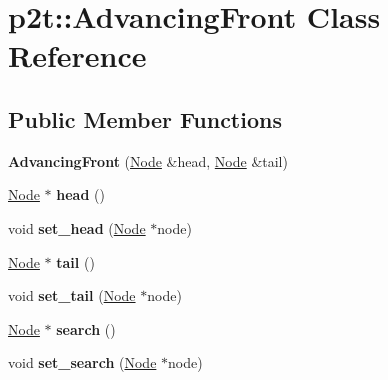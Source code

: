 \hypertarget{classp2t_1_1_advancing_front}{\section{p2t\+:\+:Advancing\+Front Class Reference}
\label{classp2t_1_1_advancing_front}
}
\subsection*{Public Member Functions}
\begin{DoxyCompactItemize}
\item 
\hypertarget{classp2t_1_1_advancing_front_aaea788406dc0ede87ab08901b64e6a62}{{\bfseries Advancing\+Front} (\hyperlink{structp2t_1_1_node}{Node} \&head, \hyperlink{structp2t_1_1_node}{Node} \&tail)}\label{classp2t_1_1_advancing_front_aaea788406dc0ede87ab08901b64e6a62}

\item 
\hypertarget{classp2t_1_1_advancing_front_a1aaf09a3d1fd17743549de1a77965883}{\hyperlink{structp2t_1_1_node}{Node} $\ast$ {\bfseries head} ()}\label{classp2t_1_1_advancing_front_a1aaf09a3d1fd17743549de1a77965883}

\item 
\hypertarget{classp2t_1_1_advancing_front_a07f4df2b993ec6fba32491d87d76aefe}{void {\bfseries set\+\_\+head} (\hyperlink{structp2t_1_1_node}{Node} $\ast$node)}\label{classp2t_1_1_advancing_front_a07f4df2b993ec6fba32491d87d76aefe}

\item 
\hypertarget{classp2t_1_1_advancing_front_a61de74fbeeb93ff0481de377d5072370}{\hyperlink{structp2t_1_1_node}{Node} $\ast$ {\bfseries tail} ()}\label{classp2t_1_1_advancing_front_a61de74fbeeb93ff0481de377d5072370}

\item 
\hypertarget{classp2t_1_1_advancing_front_a3e42d890f8871eecdbd9789d141800b8}{void {\bfseries set\+\_\+tail} (\hyperlink{structp2t_1_1_node}{Node} $\ast$node)}\label{classp2t_1_1_advancing_front_a3e42d890f8871eecdbd9789d141800b8}

\item 
\hypertarget{classp2t_1_1_advancing_front_a77046a96ab291e136dfd3072b74b88b5}{\hyperlink{structp2t_1_1_node}{Node} $\ast$ {\bfseries search} ()}\label{classp2t_1_1_advancing_front_a77046a96ab291e136dfd3072b74b88b5}

\item 
\hypertarget{classp2t_1_1_advancing_front_a27bbf888fd7c036db00347278591c2c4}{void {\bfseries set\+\_\+search} (\hyperlink{structp2t_1_1_node}{Node} $\ast$node)}\label{classp2t_1_1_advancing_front_a27bbf888fd7c036db00347278591c2c4}


\end{DoxyCompactItemize}
